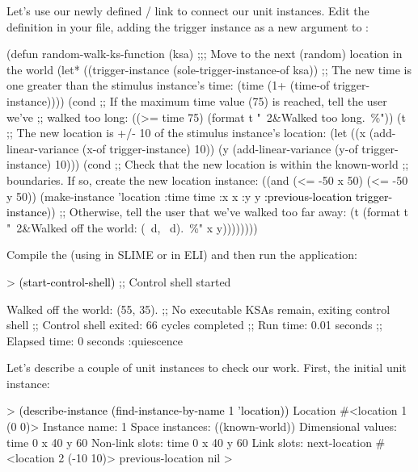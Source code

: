 \documentclass[10pt,twoside,english,pdftex]{article}
\begin{document}
Let's use our newly defined / link
to connect our  unit instances.  Edit the
 definition in your 
file, adding the trigger instance as a new  argument
to :
%
\begin{example}\color{darkergray}%
  (defun random-walk-ks-function (ksa)
    ;;; Move to the next (random) location in the world
    (let* ((trigger-instance (sole-trigger-instance-of ksa))
           ;; The new time is one greater than the stimulus instance's time:
           (time (1+ (time-of trigger-instance))))
      (cond
       ;; If the maximum time value (75) is reached, tell the user we've
       ;; walked too long:
       ((>= time 75) (format t "~2&Walked too long.~\%"))
       (t ;; The new location is +/- 10 of the stimulus instance's location:
        (let ((x (add-linear-variance (x-of trigger-instance) 10))
              (y (add-linear-variance (y-of trigger-instance) 10)))
          (cond
           ;; Check that the new location is within the known-world
           ;; boundaries.  If so, create the new location instance:
           ((and (<= -50 x 50) (<= -50 y 50))
            (make-instance 'location 
              :time time 
              :x x 
              :y y
              \textcolor{black}{:previous-location trigger-instance}))
           ;; Otherwise, tell the user that we've walked too far away:
           (t (format t "~2&Walked off the world: (~d, ~d).~\%" x y))))))))
\end{example}

Compile the  (using  in SLIME or
 in ELI) and then run the application:
%
\begin{example}\color{darkergray}%
  > \textcolor{black}{(start-control-shell)}
  ;; Control shell started

  Walked off the world: (55, 35).
  ;; No executable KSAs remain, exiting control shell
  ;; Control shell exited: 66 cycles completed
  ;; Run time: 0.01 seconds
  ;; Elapsed time: 0 seconds
  :quiescence
\end{example}

Let's describe a couple of  unit instances to check our work.
First, the initial  unit instance:
%
\begin{example}\color{darkergray}%
  > \textcolor{black}{(describe-instance (find-instance-by-name 1 'location))}
  Location #<location 1 (0 0)>
    Instance name: 1
    Space instances: ((known-world))
    Dimensional values:
      time 0
      x 40
      y 60
    Non-link slots:
      time 0
      x 40
      y 60
    Link slots:
      next-location #<location 2 (-10 10)>
      previous-location nil
  >
\end{example}
\end{document}
